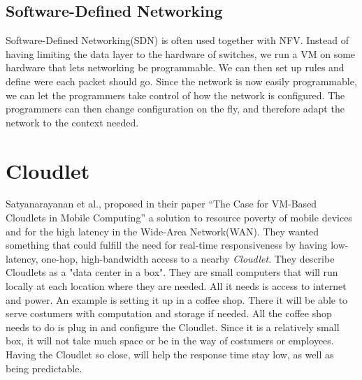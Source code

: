 \subsection{Software-Defined Networking}
Software-Defined Networking(SDN) is often used together with NFV. Instead of having limiting the data layer to the hardware of switches, we run a VM on some hardware that lets networking be programmable. We can then set up rules and define were each packet should go. Since the network is now easily programmable, we can let the programmers take control of how the network is configured. The programmers can then change configuration on the fly, and therefore adapt the network to the context needed.










\section{Cloudlet} \label{section:architecutres_cloudlet} 
Satyanarayanan et al., proposed in their paper “The Case for VM-Based Cloudlets in Mobile Computing”\cite{satyanarayanan_case_2009} a solution to resource poverty of mobile devices and for the high latency in the Wide-Area Network(WAN). They wanted something that could fulfill the need for real-time responsiveness by having low-latency, one-hop, high-bandwidth access to a nearby \textit{Cloudlet}. They describe Cloudlets as a "data center in a box"\cite{satyanarayanan_case_2009}. They are small computers that will run locally at each location where they are needed. All it needs is access to internet and power. An example is setting it up in a coffee shop. There it will be able to serve costumers with computation and storage if needed. All the coffee shop needs to do is plug in and configure the Cloudlet. Since it is a relatively small box, it will not take much space or be in the way of costumers or employees. Having the Cloudlet so close, will help the response time stay low, as well as being predictable.

